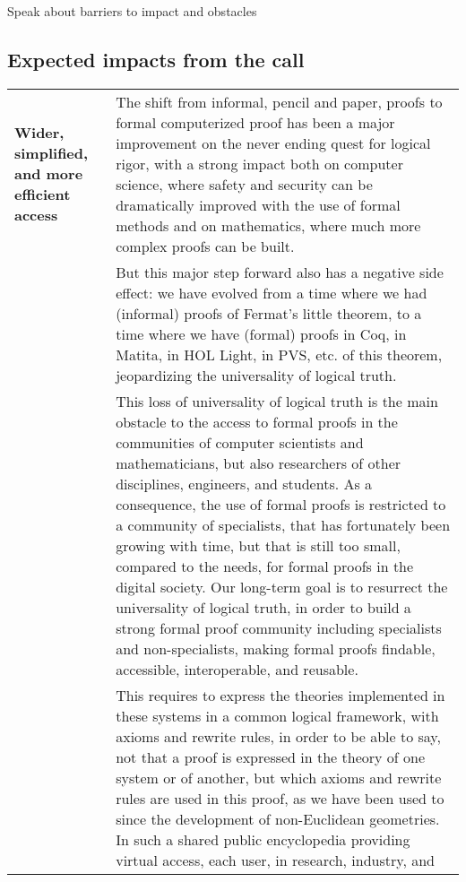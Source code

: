 {\color{red} Speak about barriers to impact and obstacles}

\subsection{Expected impacts from the call}

\begin{longtable}{|p{}|p{}|}
\hline
{\bf Wider, simplified, and more efficient access}&
The shift from informal, pencil and paper, proofs to formal
computerized proof has been a major improvement on the never ending
quest for logical rigor, with a strong impact both on computer
science, where safety and security can be dramatically improved with
the use of formal methods and on mathematics, where much more complex
proofs can be built.\\
&
\hspace{0.4cm}
But this major step forward also has a negative side effect: we have
evolved from a time where we had (informal) proofs of Fermat's little
theorem, to a time where we have (formal) proofs in Coq, in Matita, in
HOL Light, in PVS, etc.  of this theorem, jeopardizing the
universality of logical truth.\\
&
\hspace*{0.4cm}
This loss of universality of logical truth is the main obstacle to the
access to formal proofs in the communities of computer scientists and
mathematicians, but also researchers of other disciplines, engineers,
and students. As a consequence, the use of formal proofs is restricted
to a community of specialists, that has fortunately been growing with
time, but that is still too small, compared to the needs, for formal
proofs in the digital society.  Our long-term goal is to resurrect the
universality of logical truth, in order to build a strong formal proof
community including specialists and non-specialists, making
formal proofs findable, accessible, interoperable, and reusable.\\
&
\hspace{0.4cm}
This requires to express the theories implemented in these systems in
a common logical framework, with axioms and rewrite rules, in order to
be able to say, not that a proof is expressed in the theory of one
system or of another, but which axioms and rewrite rules are used in
this proof, as we have been used to since the development of
non-Euclidean geometries. In such a shared public encyclopedia
providing virtual access, each user, in research, industry, and

\end{longtable}
